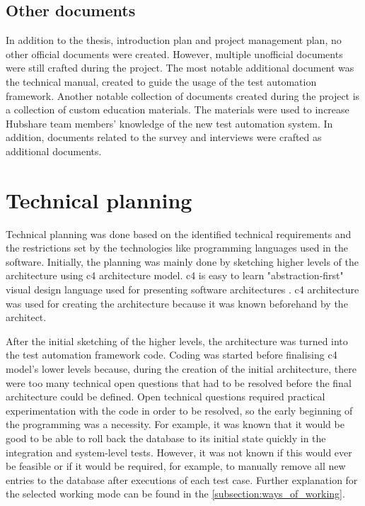 \subsection{Other documents}
In addition to the thesis, introduction plan and project management plan, no other official documents were created. However, multiple unofficial documents were still crafted during the project. The most notable additional document was the technical manual, created to guide the usage of the test automation framework. Another notable collection of documents created during the project is a collection of custom education materials. The materials were used to increase Hubshare team members' knowledge of the new test automation system. In addition, documents related to the survey and interviews were crafted as additional documents.

\section{Technical planning}
Technical planning was done based on the identified technical requirements and the restrictions set by the technologies like programming languages used in the software. Initially, the planning was mainly done by sketching higher levels of the architecture using \gls{c4} architecture model. \gls{c4} is easy to learn "abstraction-first" visual design language used for presenting software architectures \cite{brown2022c4}. \gls{c4} architecture was used for creating the architecture because it was known beforehand by the architect.

After the initial sketching of the higher levels, the architecture was turned into the test automation framework code. Coding was started before finalising \gls{c4} model's lower levels because, during the creation of the initial architecture, there were too many technical open questions that had to be resolved before the final architecture could be defined. Open technical questions required practical experimentation with the code in order to be resolved, so the early beginning of the programming was a necessity. For example, it was known that it would be good to be able to roll back the database to its initial state quickly in the integration and system-level tests. However, it was not known if this would ever be feasible or if it would be required, for example, to manually remove all new entries to the database after executions of each test case. Further explanation for the selected working mode can be found in the \autoref{subsection:ways_of_working}.

